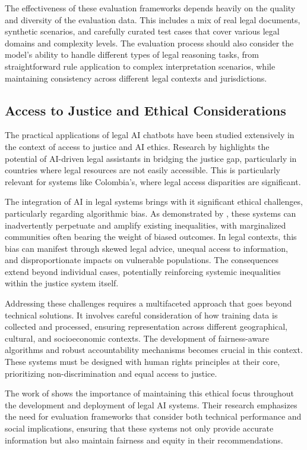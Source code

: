 The effectiveness of these evaluation frameworks depends heavily on the quality and diversity of the evaluation 
data. This includes a mix of real legal documents, synthetic scenarios, and carefully curated test cases that 
cover various legal domains and complexity levels. The evaluation process should also consider the model's 
ability to handle different types of legal reasoning tasks, from straightforward rule application to complex 
interpretation scenarios, while maintaining consistency across different legal contexts and jurisdictions.

\subsection{Access to Justice and Ethical Considerations}
The practical applications of legal AI chatbots have been studied extensively 
in the context of access to justice and AI ethics. Research by \cite{chakraborty2023revolutionizing} 
highlights the potential of AI-driven legal assistants in bridging the justice gap, particularly 
in countries where legal resources are not easily accessible. This is particularly relevant for 
systems like Colombia's, where legal access disparities are significant. 

The integration of AI in legal systems brings with it significant ethical challenges, particularly 
regarding algorithmic bias. As demonstrated by \cite{Min_bias}, these systems can inadvertently 
perpetuate and amplify existing inequalities, with marginalized communities often bearing the weight 
of biased outcomes. In legal contexts, this bias can manifest through skewed legal advice, 
unequal access to information, and disproportionate impacts on vulnerable populations. The 
consequences extend beyond individual cases, potentially reinforcing systemic inequalities 
within the justice system itself.

Addressing these challenges requires a multifaceted approach that goes beyond technical solutions. 
It involves careful consideration of how training data is collected and processed, ensuring 
representation across different geographical, cultural, and socioeconomic contexts. The development 
of fairness-aware algorithms and robust accountability mechanisms becomes crucial in this context. 
These systems must be designed with human rights principles at their core, prioritizing 
non-discrimination and equal access to justice.

The work of \cite{guha2023legalbench} shows the importance of maintaining this ethical 
focus throughout the development and deployment of legal AI systems. Their research emphasizes 
the need for evaluation frameworks that consider both technical performance and social implications, 
ensuring that these systems not only provide accurate information but also maintain fairness 
and equity in their recommendations.

